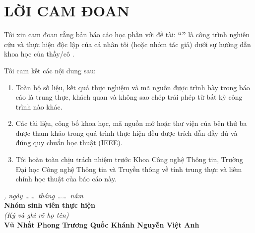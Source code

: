 
\chapter*{LỜI CAM ĐOAN}

Tôi xin cam đoan rằng bản báo cáo học phần với đề tài: \textbf{``\reporttitle''} là công trình nghiên cứu và thực hiện độc lập của cá nhân tôi (hoặc nhóm tác giả) dưới sự hướng dẫn khoa học của thầy/cô \textbf{\supervisor}.

Tôi cam kết các nội dung sau:
\begin{enumerate}[label=\alph*)]
    \item Toàn bộ số liệu, kết quả thực nghiệm và mã nguồn được trình bày trong báo cáo là trung thực, khách quan và không sao chép trái phép từ bất kỳ công trình nào khác.
    \item Các tài liệu, công bố khoa học, mã nguồn mở hoặc thư viện của bên thứ ba được tham khảo trong quá trình thực hiện đều được trích dẫn đầy đủ và đúng quy chuẩn học thuật (IEEE).
    \item Tôi hoàn toàn chịu trách nhiệm trước Khoa Công nghệ Thông tin, Trường Đại học Công nghệ Thông tin và Truyền thông về tính trung thực và liêm chính học thuật của báo cáo này.
\end{enumerate}

\vspace{1.5cm}
\begin{flushright}
    \begin{minipage}{0.5\textwidth}
        \centering
        \textit{\location, ngày \dots\dots\ tháng \dots\dots\ năm \reportyear}\\[6pt]
        \textbf{Nhóm sinh viên thực hiện}\\[20pt]
        \textit{(Ký và ghi rõ họ tên)}\\[50pt]
        \textbf{Vũ Nhất Phong \quad Trương Quốc Khánh \quad Nguyễn Việt Anh}
    \end{minipage}
\end{flushright}

\clearpage
